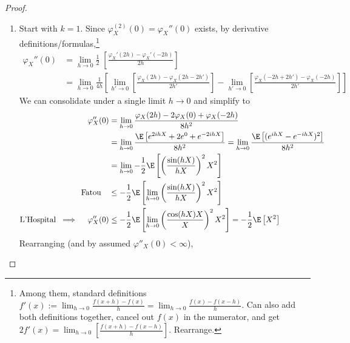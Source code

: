 \documentclass[12pt]{article}
\theoremstyle{plain}
\theoremstyle{definition}
\theoremstyle{remark}
\newcommand{\ra}{\rightarrow}
\begin{document}
\begin{proof}
\begin{enumerate}[label=(\roman*)]
  \item
    Start with $k=1$. Since $\varphi^{(2)}_X(0)=\varphi_X''(0)$ exists,
    by derivative definitions/formulas,\footnote{%
      Among them, standard definitions
      $f'(x)
      := \lim_{h\ra 0} \frac{f(x+h)-f(x)}{h}
      = \lim_{h\ra 0} \frac{f(x)-f(x-h)}{h}$.
      Can also add both definitions together, cancel out $f(x)$ in
      the numerator, and get
      $2f'(x) = \lim_{h\ra 0}
      \left[
      \frac{f(x+h)-f(x-h)}{h}
      \right]$. Rearrange.
    }
    \begin{align*}
      \varphi_X''(0)
      &= \lim_{h\ra 0}
      \frac{1}{2}
      \;\left[
      \frac{\varphi_X'(2h)-\varphi_X'(-2h)}{2h}
      \right]
      \\
      &=
      \lim_{h\ra 0}
      \frac{1}{4h}
      \left[
      \lim_{h'\ra 0}
      \left[
      \frac{\varphi_X(2h)-\varphi_X(2h-2h')}{2h'}
      \right]
      -
      \lim_{h'\ra 0}
      \left[
      \frac{\varphi_X(-2h+2h')-\varphi_X(-2h)}{2h'}
      \right]
      \right]
    \end{align*}
    We can consolidate under a single limit $h\ra0$ and simplify to
    \begin{align*}
      \varphi_X''(0)
      &=
      \lim_{h\ra 0}
      \frac{\varphi_X(2h)-2\varphi_X(0)+\varphi_X(-2h)}{8h^2}
      \\
      &=
      \lim_{h\ra 0}
      \frac{%
        \E\left[
          e^{2ihX}
          + 2e^{0}
          + e^{-2ihX}
        \right]
      }{8h^2}
      =
      \lim_{h\ra 0}
      \frac{%
        \E\left[
          (e^{ihX} - e^{-ihX})^2
        \right]
      }{8h^2}
      \\
      &=
      \lim_{h\ra 0}
      -\frac{1}{2}
      \E\left[
      \left(
      \frac{\sin(hX)}{hX}
      \right)^2
      X^2
      \right]
      \\
      \text{Fatou}\quad
      &\leq
      -\frac{1}{2}
      \E\left[
      \lim_{h\ra 0}
      \left(
      \frac{\sin(hX)}{hX}
      \right)^2
      X^2
      \right]
      \\
      \text{L'Hospital}
      \;\implies
      \quad
      \varphi_X''(0)
      &\leq
      -\frac{1}{2}
      \E\left[
      \lim_{h\ra 0}
      \left(
      \frac{\cos(hX)X}{X}
      \right)^2
      X^2
      \right]
      =
      -\frac{1}{2}
      \E\left[
      X^2
      \right]
    \end{align*}
    Rearranging (and by assumed $\varphi''_X(0)<\infty$),

\end{enumerate}
\end{proof}
\end{document}
